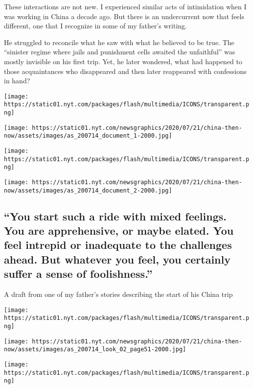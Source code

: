 These interactions are not new. I experienced similar acts of
intimidation when I was working in China a decade ago. But there is an
undercurrent now that feels different, one that I recognize in some of
my father's writing.

He struggled to reconcile what he saw with what he believed to be true.
The ``sinister regime where jails and punishment cells awaited the
unfaithful'' was mostly invisible on his first trip. Yet, he later
wondered, what had happened to those acquaintances who disappeared and
then later reappeared with confessions in hand?

\texttt{[image: https://static01.nyt.com/packages/flash/multimedia/ICONS/transparent.png]}

\texttt{[image: https://static01.nyt.com/newsgraphics/2020/07/21/china-then-now/assets/images/as\_200714\_document\_1-2000.jpg]}

\texttt{[image: https://static01.nyt.com/packages/flash/multimedia/ICONS/transparent.png]}

\texttt{[image: https://static01.nyt.com/newsgraphics/2020/07/21/china-then-now/assets/images/as\_200714\_document\_2-2000.jpg]}

\hypertarget{you-start-such-a-ride-with-mixed-feelings-you-are-apprehensive-or-maybe-elated-you-feel-intrepid-or-inadequate-to-the-challenges-ahead-but-whatever-you-feel-you-certainly-suffer-a-sense-of-foolishness}{%
\subsection{``You start such a ride with mixed feelings. You are
apprehensive, or maybe elated. You feel intrepid or inadequate to the
challenges ahead. But whatever you feel, you certainly suffer a sense of
foolishness.''}\label{you-start-such-a-ride-with-mixed-feelings-you-are-apprehensive-or-maybe-elated-you-feel-intrepid-or-inadequate-to-the-challenges-ahead-but-whatever-you-feel-you-certainly-suffer-a-sense-of-foolishness}}

A draft from one of my father's stories describing the start of his
China trip

\texttt{[image: https://static01.nyt.com/packages/flash/multimedia/ICONS/transparent.png]}

\texttt{[image: https://static01.nyt.com/newsgraphics/2020/07/21/china-then-now/assets/images/as\_200714\_look\_02\_page51-2000.jpg]}

\texttt{[image: https://static01.nyt.com/packages/flash/multimedia/ICONS/transparent.png]}

